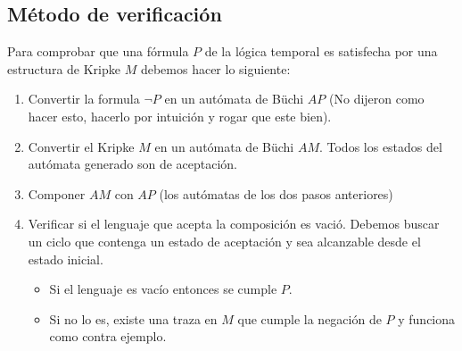 \subsection{Método de verificación}
Para comprobar que una fórmula $P$ de la lógica temporal es satisfecha por una estructura de Kripke $M$ debemos hacer lo siguiente:
\begin{enumerate}
    \item Convertir la formula $\lnot P$  en un autómata de Büchi $AP$ (No dijeron como hacer esto, hacerlo por intuición y rogar que este bien).
    \item Convertir el Kripke $M$ en un autómata de Büchi $AM$. Todos los estados del autómata generado son de aceptación.
    \item Componer $AM$ con $AP$ (los autómatas de los dos pasos anteriores)
    \item Verificar si el lenguaje que acepta la composición es vació. Debemos buscar un ciclo que contenga un estado de aceptación y sea alcanzable desde el estado inicial.
    \begin{itemize}
    	\item Si el lenguaje es vacío entonces se cumple $P$.
    	\item Si no lo es, existe una traza en $M$ que cumple la negación de $P$ y funciona como contra ejemplo.
    \end{itemize}
\end{enumerate}
